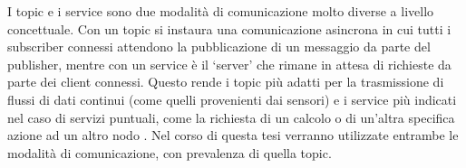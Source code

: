 I topic e i service sono due modalit\`{a} di comunicazione molto diverse a livello concettuale.
Con un topic si instaura una comunicazione asincrona in cui tutti i subscriber connessi attendono la pubblicazione 
di un messaggio da parte del publisher, mentre con un service \`{e} il `server' che rimane in attesa di richieste da 
parte dei client connessi. Questo rende i topic pi\`{u} adatti per la trasmissione di flussi di dati continui (come quelli 
provenienti dai sensori) e i service pi\`{u} indicati nel caso di servizi puntuali, come la richiesta di un calcolo o di un'altra 
specifica azione ad un altro nodo \cite{srv_topic_example}.
Nel corso di questa tesi verranno utilizzate entrambe le modalit\`{a} di comunicazione, con prevalenza di quella topic.